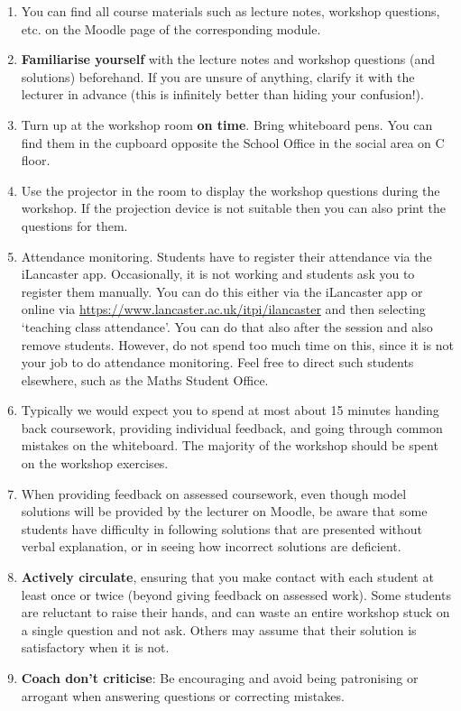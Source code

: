 \documentclass[11pt,a4paper]{amsart}
\begin{document}
\begin{enumerate}
\item You can find all course materials such as lecture notes, workshop questions, etc. on the Moodle page of the corresponding module. 
\item {\bf Familiarise yourself} with the lecture notes and workshop questions (and solutions) beforehand. If you are unsure of anything, clarify it with the lecturer in advance (this is infinitely better than hiding your confusion!). 
\item Turn up at the workshop room {\bf on time}. Bring whiteboard pens. 
You can find them in the cupboard opposite the School Office in the social area on C floor.
\item Use the projector in the room to display the workshop questions during the workshop. 
If the projection device is not suitable then you can also print the questions for them.
\item Attendance monitoring. Students have to register their attendance via the iLancaster app. 
	  Occasionally, it is not working and students ask you to register them manually. 
	  You can do this either via the iLancaster app or online via
	  \url{https://www.lancaster.ac.uk/itpi/ilancaster}
  	 and then selecting `teaching class attendance'. 
  	 You can do that also after the session and also remove students.
  	 However, do not spend too much time on this, since it is not your job to do attendance monitoring. Feel free to direct such students elsewhere, such as the Maths Student Office.
\item Typically we would expect you to spend at most about 15 minutes handing back coursework, providing individual feedback, and going through common mistakes on the whiteboard. The majority of the workshop should be spent on the workshop exercises. 
\item When providing feedback on assessed coursework, even though model solutions will be provided by the lecturer on Moodle, be aware that some students have difficulty in following solutions that are presented without verbal explanation, or in seeing how incorrect solutions are deficient.
\item {\bf Actively circulate}, ensuring that you make contact with each student at least once or twice (beyond giving feedback on assessed work). Some students are reluctant to raise their hands, and can waste an entire workshop stuck on a single question and not ask. Others may assume that their solution is satisfactory when it is not.
\item {\bf Coach don't criticise}: Be encouraging and avoid being patronising or arrogant when answering questions or correcting mistakes.

\end{enumerate}
\end{document}
